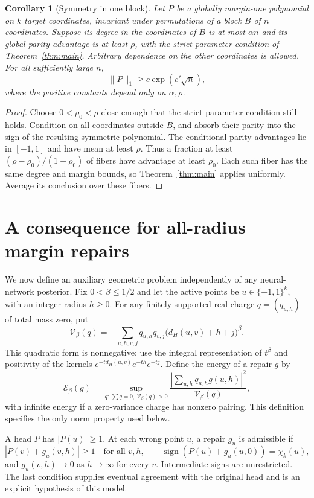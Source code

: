 \documentclass[11pt]{article}
\newtheorem{corollary}[theorem]{Corollary}
\theoremstyle{remark}\newtheorem{remark}[theorem]{Remark}
\DeclareMathOperator{\sign}{sign}
\begin{document}
\begin{corollary}[Symmetry in one block]\label{cor:block}
Let $P$ be a globally margin-one polynomial on $k$ target coordinates,
invariant under permutations of a block $B$ of $n$ coordinates. Suppose
its degree in the coordinates of $B$ is at most $\alpha n$ and its
global parity advantage is at least $\rho$, with the strict parameter
condition of Theorem~\ref{thm:main}. Arbitrary dependence on the other
coordinates is allowed. For all sufficiently large $n$,
\[
 \|P\|_1\ge c\exp(c'\sqrt n),
\]
where the positive constants depend only on $\alpha,\rho$.
\end{corollary}
\begin{proof}
Choose $0<\rho_0<\rho$ close enough that the strict parameter condition
still holds. Condition on all coordinates outside $B$, and absorb
their parity into the sign of the resulting symmetric polynomial.
The conditional parity advantages lie in $[-1,1]$ and have mean at
least $\rho$. Thus a fraction at least
$(\rho-\rho_0)/(1-\rho_0)$ of fibers have advantage at least $\rho_0$.
Each such fiber has the same degree and margin bounds, so
Theorem~\ref{thm:main} applies uniformly. Average its conclusion over
these fibers.
\end{proof}

\section{A consequence for all-radius margin repairs}
We now define an auxiliary geometric problem independently of any
neural-network posterior. Fix $0<\beta\le1/2$ and let the active points
be $u\in\{-1,1\}^k$, with an integer radius $h\ge0$. For any finitely
supported real charge $q=(q_{u,h})$ of total mass zero, put
\begin{equation}\label{eq:cusp}
 \mathcal V_\beta(q)=
 -\sum_{u,h,v,j}q_{u,h}q_{v,j}\bigl(d_H(u,v)+h+j\bigr)^\beta.
\end{equation}
This quadratic form is nonnegative: use the integral representation of
$t^\beta$ and positivity of the kernels
$e^{-t d_H(u,v)}e^{-th}e^{-tj}$. Define the energy of a repair $g$ by
\[
 \mathcal E_\beta(g)=
 \sup_{q:\,\sum q=0,\ \mathcal V_\beta(q)>0}
 \frac{\left|\sum_{u,h}q_{u,h}g(u,h)\right|^2}
      {\mathcal V_\beta(q)},
\]
with infinite energy if a zero-variance charge has nonzero pairing.
This definition specifies the only norm property used below.

A head $P$ has $|P(u)|\ge1$. At each wrong point $u$, a repair $g_u$
is admissible if
\[
 |P(v)+g_u(v,h)|\ge1\quad\text{for all }v,h,
 \qquad \sign(P(u)+g_u(u,0))=\chi_k(u),
\]
and $g_u(v,h)\to0$ as $h\to\infty$ for every $v$. Intermediate signs
are unrestricted. The last condition supplies eventual agreement with
the original head and is an explicit hypothesis of this model.
\end{document}

